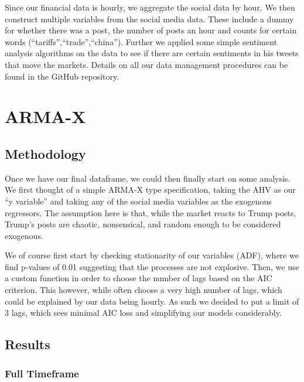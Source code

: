 \documentclass[
]{article}
\begin{document}
Since our financial data is hourly, we aggregate the social data by hour. We
then construct multiple variables from the social media data. These include
a dummy for whether there was a post, the number of posts an hour and counts
for certain words (``tariffs'',``trade'',``china''). Further we applied some simple
sentiment analysis algorithms on the data to see if there are certain sentiments
in his tweets that move the markets. Details on all our data management procedures
can be found in the GitHub repository.

\section{ARMA-X}\label{arma-x}

\subsection{Methodology}\label{methodology}

Once we have our final dataframe, we could then finally start on some analysis.
We first thought of a simple ARMA-X type specification, taking the AHV as our
``y variable'' and taking any of the social media variables as the exogenous
regressors. The assumption here is that, while the market reacts to Trump posts,
Trump's posts are chaotic, nonsensical, and random enough to be considered
exogenous.

We of course first start by checking stationarity of our variables (ADF), where we find
p-values of 0.01 suggesting that the processes are not explosive. Then, we use
a custom function in order to choose the number of lags based on the AIC criterion.
This however, while often choose a very high number of lags, which could be
explained by our data being hourly. As such we decided to put a limit of 3 lags,
which sees minimal AIC loss and simplifying our models considerably.

\subsection{Results}\label{results}

\subsubsection{Full Timeframe}\label{full-timeframe}
\end{document}

